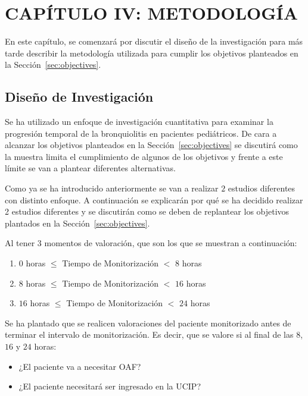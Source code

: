 \section{CAPÍTULO IV: METODOLOGÍA}\label{cap:methodology}

En este capítulo, se comenzará por discutir el diseño de la investigación para más tarde describir la metodología utilizada para cumplir los objetivos planteados en la Sección~\ref{sec:objectives}. 

\subsection{Diseño de Investigación}

Se ha utilizado un enfoque de investigación cuantitativa para examinar la progresión temporal de la bronquiolitis en pacientes pediátricos. De cara a alcanzar los objetivos planteados en la Sección~\ref{sec:objectives} se discutirá como la muestra limita el cumplimiento de algunos de los objetivos y frente a este límite se van a plantear diferentes alternativas. 

Como ya se ha introducido anteriormente se van a realizar $2$ estudios diferentes con distinto enfoque. A continuación se explicarán por qué se ha decidido realizar 2 estudios diferentes y se discutirán como se deben de replantear los objetivos plantados en la Sección~\ref{sec:objectives}.

Al tener 3 momentos de valoración, que son los que se muestran a continuación:

\begin{enumerate}
    \item $0$ horas $\leq$ Tiempo de Monitorización $<$ $8$ horas 
    \item $8$ horas $\leq$ Tiempo de Monitorización $<$ $16$ horas
    \item $16$ horas $\leq$ Tiempo de Monitorización $<$ $24$ horas
\end{enumerate}


Se ha plantado que se realicen valoraciones del paciente monitorizado antes de terminar el intervalo de monitorización. Es decir, que se valore si al final de las $8$, $16$ y $24$ horas: 

\begin{itemize}
    \item ¿El paciente va a necesitar OAF?
    \item ¿El paciente necesitará ser ingresado en la UCIP?
\end{itemize}

